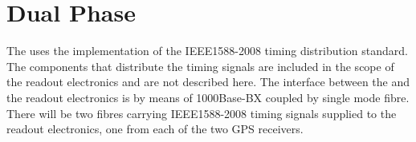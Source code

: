 \documentclass{article}
\begin{document}
\section{Dual Phase}

The  uses the  implementation of the IEEE1588-2008 timing distribution standard. The components that distribute the timing signals are included in the scope of the  readout electronics and are not described here. The interface between the  and the  readout electronics is by means of 1000Base-BX  coupled by single mode fibre. There will be two fibres carrying IEEE1588-2008 timing signals supplied to the  readout electronics, one from each of the two GPS receivers.



\printglossary
\end{document}
